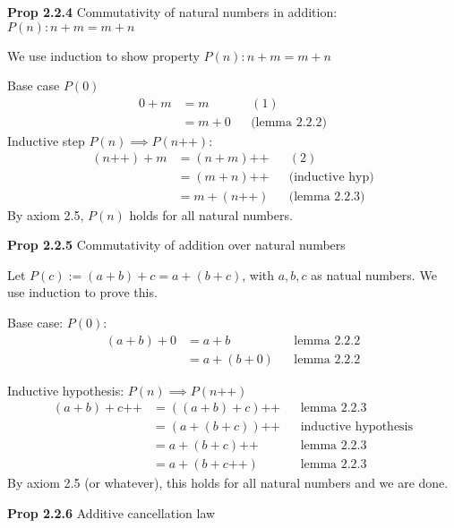 \documentclass[answers,12pt]{exam}
\newcommand{\increment}{\text{++}}
\begin{document}
\textbf{Prop 2.2.4} Commutativity of natural numbers in addition: $P(n): n+m = m+n$

\begin{solution}
    We use induction to show property $P(n): n + m = m + n$

    Base case $P(0)$
    \begin{align*}
        0+m &= m && (1) \\
        &= m+0 && \text{(lemma 2.2.2)}
    \end{align*}
    Inductive step $P(n) \implies P(n\increment)$:
    \begin{align*}
        (n \increment) + m &= (n+m) \increment && (2) \\
        &= (m+n) \increment && \text{(inductive hyp)} \\
        &= m+ (n \increment) && \text{(lemma 2.2.3)}
    \end{align*}
    By axiom 2.5, $P(n)$ holds for all natural numbers.
\end{solution}

\textbf{Prop 2.2.5} Commutativity of addition over natural numbers

\begin{solution}
    Let $P(c):= (a+b)+c = a+(b+c)$, with $a,b,c$ as natual numbers.
    We use induction to prove this.
    
    Base case: $P(0)$:
    \begin{align*}
        (a+b)+0 &= a+b && \text{lemma 2.2.2}\\
        &= a+(b+0) && \text{lemma 2.2.2}
    \end{align*}

    Inductive hypothesis: $P(n) \implies P(n \increment)$
    \begin{align*}
        (a+b)+ c \increment &= ((a+b)+c) \increment && \text{lemma 2.2.3} \\
        &=(a+(b+c))\increment && \text{inductive hypothesis} \\
        &= a + (b+c) \increment && \text{lemma 2.2.3} \\
        &= a+(b+c \increment) && \text{lemma 2.2.3}
    \end{align*}
    By axiom 2.5 (or whatever), this holds for all natural numbers and we are done.
\end{solution}

\textbf{Prop 2.2.6} Additive cancellation law
\end{document}
